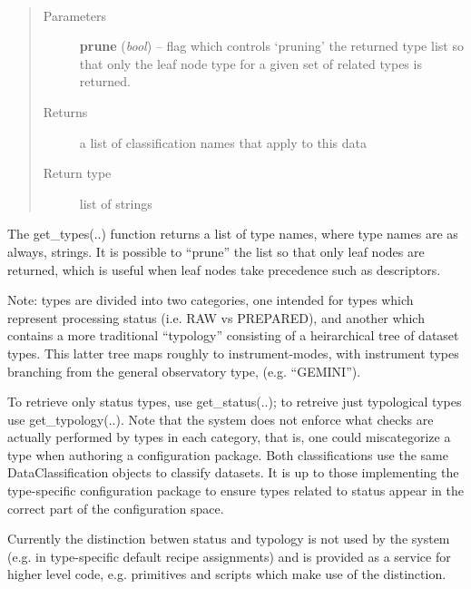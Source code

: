 \documentclass[letterpaper,10pt,english]{sphinxmanual}
\begin{document}
\begin{fulllineitems}
\label{chapter_AstroDataClass:astrodata.data.AstroData.get_types}~\begin{quote}\begin{description}
\item[{Parameters}] \leavevmode
\textbf{prune} (\emph{bool}) -- flag which controls `pruning' the returned type list 
so that only the leaf node type for a given set of related types
is returned.

\item[{Returns}] \leavevmode
a list of classification names that apply to this data

\item[{Return type}] \leavevmode
list of strings

\end{description}\end{quote}

The get\_types(..) function returns a list of type names, where type 
names are as always, strings. It is possible to ``prune'' the list so
that only leaf nodes are returned, which is useful when leaf
nodes take precedence such
as descriptors.

Note: types are divided into two categories, one intended for types
which represent processing status (i.e. RAW vs PREPARED), and another
which contains a more traditional ``typology'' consisting of a 
heirarchical tree of dataset types. This latter tree maps roughly to
instrument-modes, with instrument types branching from the general
observatory type, (e.g. ``GEMINI'').

To retrieve only status types, use get\_status(..); to retreive just
typological types use get\_typology(..).  Note that the system does not
enforce what checks are actually performed by types in each category,
that is, one could miscategorize a type when authoring a configuration
package. Both classifications use the same DataClassification objects
to classify datasets. It is up to  those implementing the
type-specific configuration package to ensure types related to status
appear in the correct part of the configuration space.

Currently the distinction betwen status and typology is not used by the
system (e.g. in type-specific default recipe assignments) and is
provided as a service for higher level code, e.g. primitives and
scripts which make use of the distinction.

\end{fulllineitems}
\end{document}
